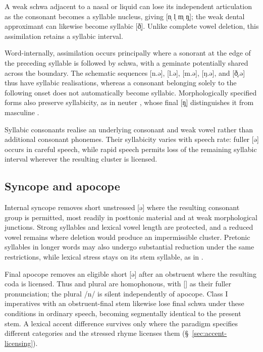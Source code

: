 A weak schwa adjacent to a nasal or liquid can lose its independent articulation as the consonant becomes a syllable nucleus, giving [n̩ l̩ m̩ ŋ̩]; the weak dental approximant can likewise become syllabic [ð̩]. Unlike complete vowel deletion, this assimilation retains a syllabic interval.

Word-internally, assimilation occurs principally where a sonorant at the edge of the preceding syllable is followed by schwa, with a geminate potentially shared across the boundary. The schematic sequences [n.ə], [l.ə], [m.ə], [ŋ.ə], and [ð̞.ə] thus have syllabic realisations, whereas a consonant belonging solely to the following onset does not automatically become syllabic. Morphologically specified forms also preserve syllabicity, as in neuter , whose final [ŋ̩] distinguishes it from masculine .

Syllabic consonants realise an underlying consonant and weak vowel rather than additional consonant phonemes. Their syllabicity varies with speech rate: fuller [ə] occurs in careful speech, while rapid speech permits loss of the remaining syllabic interval wherever the resulting cluster is licensed.

\subsection{Syncope and apocope}
\label{sec:apocope}

Internal syncope removes short unstressed [ə] where the resulting consonant group is permitted, most readily in posttonic material and at weak morphological junctions. Strong syllables and lexical vowel length are protected, and a reduced vowel remains where deletion would produce an impermissible cluster. Pretonic syllables in longer words may also undergo substantial reduction under the same restrictions, while lexical stress stays on its stem syllable, as in .

Final apocope removes an eligible short [ə] after an obstruent where the resulting coda is licensed. Thus  and plural  are homophonous, with [] as their fuller pronunciation; the plural /n/ is silent independently of apocope. Class I imperatives with an obstruent-final stem likewise lose final schwa under these conditions in ordinary speech, becoming segmentally identical to the present stem. A lexical accent difference survives only where the paradigm specifies different categories and the stressed rhyme licenses them (\S~\ref{sec:accent-licensing}).

